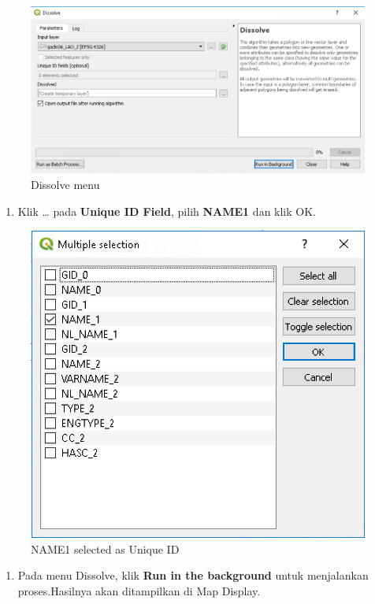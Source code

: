 \documentclass[]{book}
\providecommand{\tightlist}{%
  \setlength{\itemsep}{0pt}\setlength{\parskip}{0pt}}
\begin{document}
\begin{figure}

{\centering \includegraphics[width=0.6\linewidth]{images/04/fig19a} 

}

\caption{Dissolve menu}\label{fig:fig1419a}
\end{figure}

\begin{enumerate}
\def\labelenumi{\arabic{enumi}.}
\setcounter{enumi}{2}
\tightlist
\item
  Klik \ldots{} pada \textbf{Unique ID Field}, pilih \textbf{NAME1} dan klik OK.
\end{enumerate}

\begin{figure}

{\centering \includegraphics[width=0.6\linewidth]{images/04/fig20} 

}

\caption{NAME1 selected as Unique ID}\label{fig:fig1420}
\end{figure}

\begin{enumerate}
\def\labelenumi{\arabic{enumi}.}
\setcounter{enumi}{3}
\tightlist
\item
  Pada menu Dissolve, klik \textbf{Run in the background} untuk menjalankan proses.Hasilnya akan ditampilkan di Map Display.
\end{enumerate}
\end{document}
